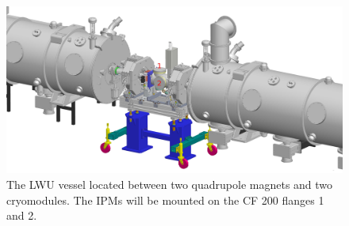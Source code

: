 \begin{figure}[ht]
	\includegraphics[width=\textwidth]{03_Prototype/figures/fig016_LWU_Cryo3.jpeg}
	\caption[The LWU vessel located between two quadrupole magnets and two cryomodules]{The LWU vessel located between two quadrupole magnets and two cryomodules. The IPMs will be mounted on the CF 200 flanges 1 and 2.}
	\label{chap3:LWU_Cryo}
\end{figure}
